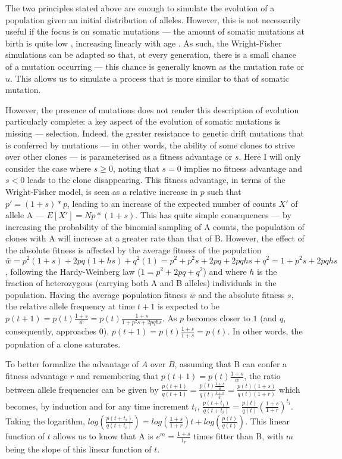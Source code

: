 The two principles stated above are enough to simulate the evolution of a population given an initial distribution of alleles. However, this is not necessarily useful if the focus is on somatic mutations --- the amount of somatic mutations at birth is quite low \cite{SpencerChapman_2021_gjz4x4}, increasing linearly with age \cite{Abascal_2021_gjvqfm}. As such, the Wright-Fisher simulations can be adapted so that, at every generation, there is a small chance of a mutation occurring --- this chance is generally known as the mutation rate or $u$. This allows us to simulate a process that is more similar to that of somatic mutation.

However, the presence of mutations does not render this description of evolution particularly complete: a key aspect of the evolution of somatic mutations is missing --- selection. Indeed, the greater resistance to genetic drift mutations that is conferred by mutations --- in other words, the ability of some clones to strive over other clones --- is parameterised as a fitness advantage or $s$. Here I will only consider the case where $s \geq 0$, noting that $s = 0$ implies no fitness advantage and $s < 0$ leads to the clone disappearing. This fitness advantage, in terms of the Wright-Fisher model, is seen as a relative increase in $p$ such that $p' = (1+s)*p$, leading to an increase of the expected number of counts $X'$ of allele A --- $E[X'] = Np*(1+s)$. This has quite simple consequences --- by increasing the probability of the binomial sampling of A counts, the population of clones with A will increase at a greater rate than that of B. However, the effect of the absolute fitness is affected by the average fitness of the population $\bar{w} = p^2(1+s) + 2pq(1+hs) + q^2(1) = p^2 + p^2s + 2pq + 2pqhs + q^2 = 1 + p^2s + 2pqhs$, following the Hardy-Weinberg law ($1 = p^2 + 2pq + q^2$) and where $h$ is the fraction of heterozygous (carrying both A and B alleles) individuals in the population. Having the average population fitness $\bar{w}$ and the absolute fitness $s$, the relative allele frequency at time $t+1$ is expected to be $p(t+1) = p(t)\frac{1+s}{\bar{w}} = p(t)\frac{1+s}{1 + p^2s + 2pqhs}$. As $p$ becomes closer to $1$ (and $q$, consequently, approaches $0$), $p(t+1) = p(t)\frac{1+s}{1+s} = p(t)$. In other words, the population of a clone saturates.

To better formalize the advantage of $A$ over $B$, assuming that B can confer a fitness advantage $r$ and remembering that $p(t+1) = p(t)\frac{1+s}{\bar{w}}$, the ratio between allele frequencies can be given by $\frac{p(t+1)}{q(t+1)} = \frac{p(t)\frac{1+s}{\bar{w}}}{q(t)\frac{1+s}{\bar{w}}} = \frac{p(t)(1+s)}{q(t)(1+r)}$ which becomes, by induction and for any time increment $t_i$, $\frac{p(t+t_1)}{q(t+t_i)}=\frac{p(t)}{q(t)}(\frac{1+s}{1+r})^{t_i}$. Taking the logarithm, $log(\frac{p(t+t_i)}{q(t+t_i)}) = log(\frac{1+s}{1+r})t + log(\frac{p(t)}{q(t)})$. This linear function of $t$ allows us to know that A is $e^{m} = \frac{1+s}{1_r}$ times fitter than B, with $m$ being the slope of this linear function of $t$. 


